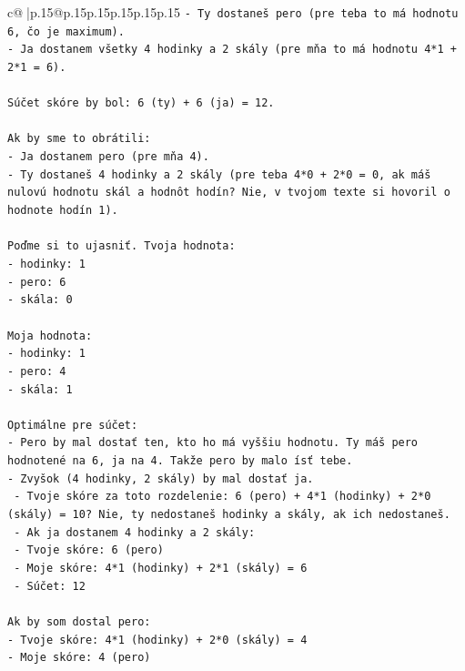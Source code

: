 \documentclass{article}
\begin{document}
{\begin{supertabular}{c@{$\;$}|p{.15\linewidth}@{}p{.15\linewidth}p{.15\linewidth}p{.15\linewidth}p{.15\linewidth}p{.15\linewidth}}
{{{\texttt{{-} Ty dostaneš pero (pre teba to má hodnotu 6, čo je maximum).} \\
\texttt{{-} Ja dostanem všetky 4 hodinky a 2 skály (pre mňa to má hodnotu 4*1 + 2*1 = 6).} \\
\\ 
\texttt{Súčet skóre by bol: 6 (ty) + 6 (ja) = 12.} \\
\\ 
\texttt{Ak by sme to obrátili:} \\
\texttt{{-} Ja dostanem pero (pre mňa 4).} \\
\texttt{{-} Ty dostaneš 4 hodinky a 2 skály (pre teba 4*0 + 2*0 = 0, ak máš nulovú hodnotu skál a hodnôt hodín? Nie, v tvojom texte si hovoril o hodnote hodín 1).} \\
\\ 
\texttt{Poďme si to ujasniť. Tvoja hodnota:} \\
\texttt{{-} hodinky: 1} \\
\texttt{{-} pero: 6} \\
\texttt{{-} skála: 0} \\
\\ 
\texttt{Moja hodnota:} \\
\texttt{{-} hodinky: 1} \\
\texttt{{-} pero: 4} \\
\texttt{{-} skála: 1} \\
\\ 
\texttt{Optimálne pre súčet:} \\
\texttt{{-} Pero by mal dostať ten, kto ho má vyššiu hodnotu. Ty máš pero hodnotené na 6, ja na 4. Takže pero by malo ísť tebe.} \\
\texttt{{-} Zvyšok (4 hodinky, 2 skály) by mal dostať ja.} \\
\texttt{  {-} Tvoje skóre za toto rozdelenie: 6 (pero) + 4*1 (hodinky) + 2*0 (skály) = 10? Nie, ty nedostaneš hodinky a skály, ak ich nedostaneš.} \\
\texttt{  {-} Ak ja dostanem 4 hodinky a 2 skály:} \\
\texttt{    {-} Tvoje skóre: 6 (pero)} \\
\texttt{    {-} Moje skóre: 4*1 (hodinky) + 2*1 (skály) = 6} \\
\texttt{    {-} Súčet: 12} \\
\\ 
\texttt{Ak by som dostal pero:} \\
\texttt{{-} Tvoje skóre: 4*1 (hodinky) + 2*0 (skály) = 4} \\
\texttt{{-} Moje skóre: 4 (pero)} \\
}}}
\end{supertabular}}
\end{document}
